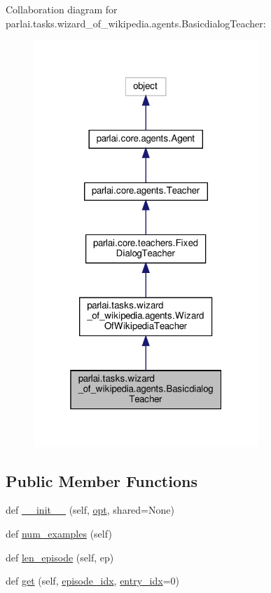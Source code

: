 Collaboration diagram for parlai.\+tasks.\+wizard\+\_\+of\+\_\+wikipedia.\+agents.\+Basicdialog\+Teacher\+:
\nopagebreak
\begin{figure}[H]
\begin{center}
\leavevmode
\includegraphics[width=241pt]{classparlai_1_1tasks_1_1wizard__of__wikipedia_1_1agents_1_1BasicdialogTeacher__coll__graph}
\end{center}
\end{figure}
\subsection*{Public Member Functions}
\begin{DoxyCompactItemize}
\item 
def \hyperlink{classparlai_1_1tasks_1_1wizard__of__wikipedia_1_1agents_1_1BasicdialogTeacher_a15a3b192484500d616eeac7bcd871cc2}{\+\_\+\+\_\+init\+\_\+\+\_\+} (self, \hyperlink{classparlai_1_1tasks_1_1wizard__of__wikipedia_1_1agents_1_1WizardOfWikipediaTeacher_a5d97ef38a8c6e7df29724122f5b9ff72}{opt}, shared=None)
\item 
def \hyperlink{classparlai_1_1tasks_1_1wizard__of__wikipedia_1_1agents_1_1BasicdialogTeacher_ac740a641709550f191b2c48adfb14a13}{num\+\_\+examples} (self)
\item 
def \hyperlink{classparlai_1_1tasks_1_1wizard__of__wikipedia_1_1agents_1_1BasicdialogTeacher_a2557378cd9519f4596b2fcc713698056}{len\+\_\+episode} (self, ep)
\item 
def \hyperlink{classparlai_1_1tasks_1_1wizard__of__wikipedia_1_1agents_1_1BasicdialogTeacher_ae457e3f6ba55bc18191d0fbcc4b408a1}{get} (self, \hyperlink{classparlai_1_1core_1_1teachers_1_1FixedDialogTeacher_afd4ebab8063eb42d182d30a1a41f133e}{episode\+\_\+idx}, \hyperlink{classparlai_1_1core_1_1teachers_1_1FixedDialogTeacher_ae3201b15f3c3b46a2f3511bad9b43e7d}{entry\+\_\+idx}=0)
\end{DoxyCompactItemize}
